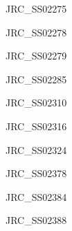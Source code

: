 \documentclass[17pt]{extarticle}
\begin{document}
\newpage\vspace*{-0.15cm}
\begin{large}
JRC\_SS02275 \\[0.5em]
\end{large}

\newpage\vspace*{-0.15cm}
\begin{large}
JRC\_SS02278 \\[0.5em]
\end{large}

\newpage\vspace*{-0.15cm}
\begin{large}
JRC\_SS02279 \\[0.5em]
\end{large}

\newpage\vspace*{-0.15cm}
\begin{large}
JRC\_SS02285 \\[0.5em]
\end{large}

\newpage\vspace*{-0.15cm}
\begin{large}
JRC\_SS02310 \\[0.5em]
\end{large}

\newpage\vspace*{-0.15cm}
\begin{large}
JRC\_SS02316 \\[0.5em]
\end{large}

\newpage\vspace*{-0.15cm}
\begin{large}
JRC\_SS02324 \\[0.5em]
\end{large}

\newpage\vspace*{-0.15cm}
\begin{large}
JRC\_SS02378 \\[0.5em]
\end{large}

\newpage\vspace*{-0.15cm}
\begin{large}
JRC\_SS02384 \\[0.5em]
\end{large}

\newpage\vspace*{-0.15cm}
\begin{large}
JRC\_SS02388 \\[0.5em]
\end{large}
\end{document}
